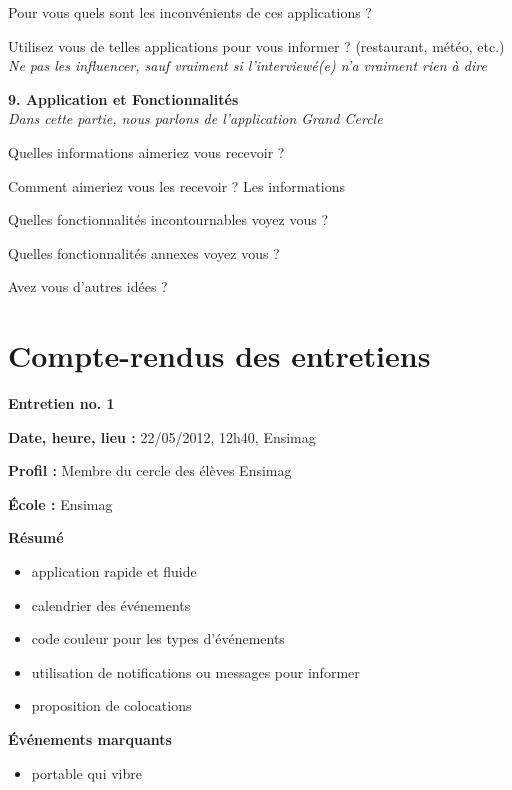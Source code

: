 \documentclass[a4paper, 11px]{article}
\begin{document}
Pour vous quels sont les inconvénients de ces applications ?

Utilisez vous de telles applications pour vous informer ? (restaurant, météo, etc.)
\textit {Ne pas les influencer, sauf vraiment si l'interviewé(e) n'a vraiment rien à dire}


\vspace{.3cm}

 \textbf {\large 9. Application et Fonctionnalités}\\
\textit{Dans cette partie, nous parlons de l'application Grand Cercle}

Quelles informations aimeriez vous recevoir ?


Comment aimeriez vous les recevoir ?
Les informations


Quelles fonctionnalités incontournables voyez vous ?


Quelles fonctionnalités annexes voyez vous ?


Avez vous d'autres idées ?

\newpage

\section{Compte-rendus des entretiens}

 \textbf {\large Entretien no. 1}

\textbf{Date, heure, lieu : }
22/05/2012, 12h40, Ensimag

\textbf{Profil : }
Membre du cercle des élèves Ensimag

\textbf{École : }
Ensimag

\textbf{Résumé}

	\begin{itemize}
		\item application rapide et fluide
		\item calendrier des événements
		\item code couleur pour les types d'événements
		\item utilisation de notifications ou messages pour informer
		\item proposition de colocations
	\end{itemize}

\vspace{.25cm}
\textbf{Événements marquants}	
	\begin{itemize}
		\item portable qui vibre
	\end{itemize}
\end{document}
